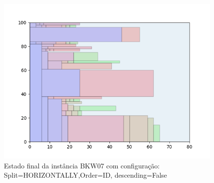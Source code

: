 \begin{figure}[H]
    \centering
    \caption[]{Estado final da instância BKW07 com configuração: Split=HORIZONTALLY,Order=ID, descending=False}
    \label{fig:bkw07-horizontally-id-false}
    \includegraphics[scale=0.5]{output/figures/bkw/bkw07/horizontally/id/false/00}
\end{figure}